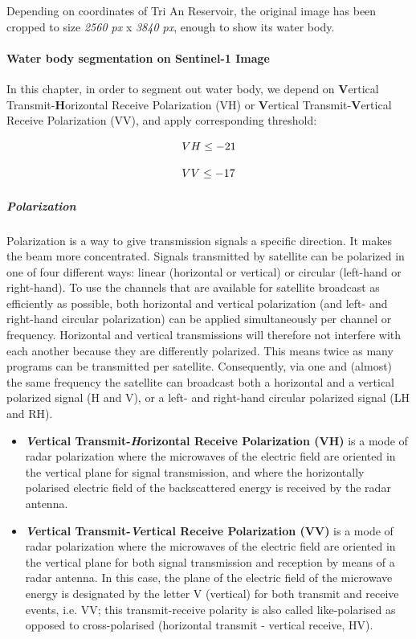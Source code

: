Depending on coordinates of Tri An Reservoir, the original image has been cropped to size \textit{2560 px} x \textit{3840 px}, enough to show its water body.

\paragraph{Water body segmentation on Sentinel-1 Image} In this chapter, in order to segment out water body, we depend on \textbf{V}ertical Transmit-\textbf{H}orizontal Receive Polarization (VH) or \textbf{V}ertical Transmit-\textbf{V}ertical Receive Polarization (VV), and apply corresponding threshold:

\begin{equation}
\centering
VH \leq -21
\end{equation} 

\begin{equation}
\centering
VV \leq -17
\end{equation} 

\subparagraph{Polarization} Polarization is a way to give transmission signals a specific direction. It makes the beam more concentrated. Signals transmitted by satellite can be polarized in one of four different ways: linear (horizontal or vertical) or circular (left-hand or right-hand). To use the channels that are available for satellite broadcast as efficiently as possible, both horizontal and vertical polarization (and left- and right-hand circular polarization) can be applied simultaneously per channel or frequency. Horizontal and vertical transmissions will therefore not interfere with each another because they are differently polarized. This means twice as many programs can be transmitted per satellite. Consequently, via one and (almost) the same frequency the satellite can broadcast both a horizontal and a vertical polarized signal (H and V), or a left- and right-hand circular polarized signal (LH and RH).

\begin{itemize}
    \item \textbf{\textit{V}ertical Transmit-\textit{H}orizontal Receive Polarization (VH)} is a mode of radar polarization where the microwaves of the electric field are oriented in the vertical plane for signal transmission, and where the horizontally polarised electric field of the backscattered energy is received by the radar antenna.
    \item \textbf{\textit{V}ertical Transmit-\textit{V}ertical Receive Polarization (VV)} is a mode of radar polarization where the microwaves of the electric field are oriented in the vertical plane for both signal transmission and reception by means of a radar antenna. In this case, the plane of the electric field of the microwave energy is designated by the letter V (vertical) for both transmit and receive events, i.e. VV; this transmit-receive polarity is also called like-polarised as opposed to cross-polarised (horizontal transmit - vertical receive, HV). 
\end{itemize}

